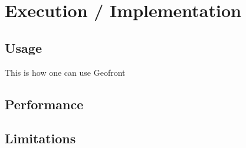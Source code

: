 \chapter{Execution / Implementation}%

\section{Usage}%

This is how one can use Geofront

\section{Performance}%

\section{Limitations}%